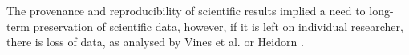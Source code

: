 
The provenance and reproducibility of scientific results implied a need to long-term preservation of scientific data, however, if it is left on individual researcher, there is loss of data, as analysed by Vines et al. or Heidorn \cite{Vines2014,P.BryanHeidorn2008}.

